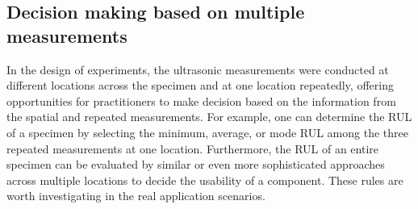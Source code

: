 \subsection{Decision making based on multiple measurements}
In the design of experiments, the ultrasonic measurements were conducted at different locations across the specimen and at one location repeatedly, offering opportunities for practitioners to make decision based on the information from the spatial and repeated measurements. For example, one can determine the RUL of a specimen by selecting the minimum, average, or mode RUL among the three repeated measurements at one location. Furthermore, the RUL of an entire specimen can be evaluated by similar or even more sophisticated approaches across multiple locations to decide the usability of a component. These rules are worth investigating in the real application scenarios.
